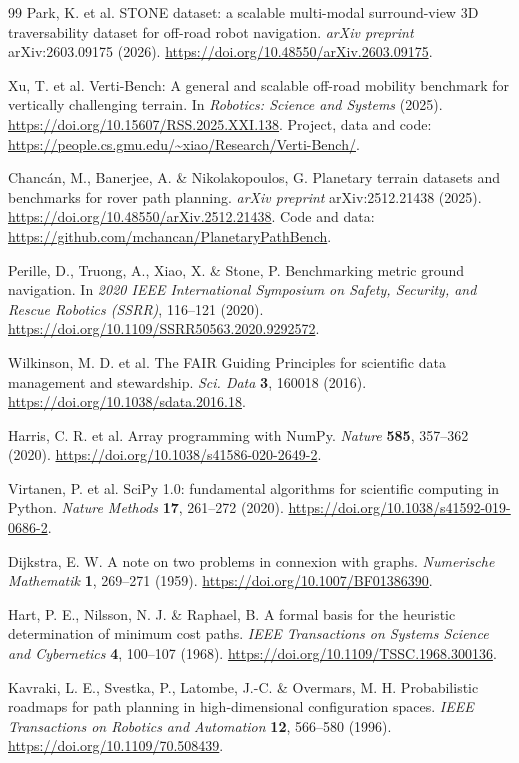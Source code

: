 \documentclass[11pt]{article}
\begin{document}
\begin{thebibliography}{99}
Park, K. et al. STONE dataset: a scalable multi-modal surround-view 3D
traversability dataset for off-road robot navigation. \textit{arXiv preprint}
arXiv:2603.09175 (2026).
\url{https://doi.org/10.48550/arXiv.2603.09175}.

Xu, T. et al. Verti-Bench: A general and scalable off-road mobility benchmark
for vertically challenging terrain. In \textit{Robotics: Science and Systems}
(2025). \url{https://doi.org/10.15607/RSS.2025.XXI.138}.
Project, data and code: \url{https://people.cs.gmu.edu/~xiao/Research/Verti-Bench/}.

Chanc\'{a}n, M., Banerjee, A. \& Nikolakopoulos, G. Planetary terrain datasets
and benchmarks for rover path planning. \textit{arXiv preprint}
arXiv:2512.21438 (2025).
\url{https://doi.org/10.48550/arXiv.2512.21438}.
Code and data: \url{https://github.com/mchancan/PlanetaryPathBench}.

Perille, D., Truong, A., Xiao, X. \& Stone, P. Benchmarking metric ground
navigation. In \textit{2020 IEEE International Symposium on Safety, Security,
and Rescue Robotics (SSRR)}, 116--121 (2020).
\url{https://doi.org/10.1109/SSRR50563.2020.9292572}.

Wilkinson, M. D. et al. The FAIR Guiding Principles for scientific data
management and stewardship. \textit{Sci. Data} \textbf{3}, 160018 (2016).
\url{https://doi.org/10.1038/sdata.2016.18}.

Harris, C. R. et al. Array programming with NumPy. \textit{Nature}
\textbf{585}, 357--362 (2020).
\url{https://doi.org/10.1038/s41586-020-2649-2}.

Virtanen, P. et al. SciPy 1.0: fundamental algorithms for scientific computing
in Python. \textit{Nature Methods} \textbf{17}, 261--272 (2020).
\url{https://doi.org/10.1038/s41592-019-0686-2}.

Dijkstra, E. W. A note on two problems in connexion with graphs.
\textit{Numerische Mathematik} \textbf{1}, 269--271 (1959).
\url{https://doi.org/10.1007/BF01386390}.

Hart, P. E., Nilsson, N. J. \& Raphael, B. A formal basis for the heuristic
determination of minimum cost paths. \textit{IEEE Transactions on Systems
Science and Cybernetics} \textbf{4}, 100--107 (1968).
\url{https://doi.org/10.1109/TSSC.1968.300136}.

Kavraki, L. E., Svestka, P., Latombe, J.-C. \& Overmars, M. H. Probabilistic
roadmaps for path planning in high-dimensional configuration spaces.
\textit{IEEE Transactions on Robotics and Automation} \textbf{12}, 566--580
(1996). \url{https://doi.org/10.1109/70.508439}.


\end{thebibliography}
\end{document}

